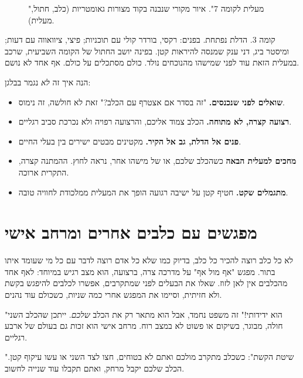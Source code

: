 \begin{figure}[h]
  \centering
  \elevatorScene
  \caption{"מעלית לקומה 7". איור מקורי שנבנה בקוד  מצורות גאומטריות (כלב, חתול, מעלית).}
  \label{fig:elevator}
\end{figure}

קומה 3. הדלת נפתחת. בפנים: רקסי, בורדר קולי עם תוכניות; פיצי, צ\gr יוואווה עם דעות; ומיסטר ביג,
דני ענק שמנסה להיראות קטן. בפינה יושב החתול של הקומה השביעית, שרכב במעלית הזאת עוד לפני
שמישהו מהנוכחים נולד. כולם מסתכלים על כולם. אף אחד לא נושם.

הנה איך זה \emph{לא} נגמר בבלגן:

\begin{tipbox}
\begin{itemize}
  \item \textbf{שואלים לפני שנכנסים.} "זה בסדר אם אצטרף עם הכלב?" זאת לא חולשה, זה נימוס.
  \item \textbf{רצועה קצרה, לא מתוחה.} הכלב צמוד אליכם, והרצועה רפויה ולא נכרכת סביב רגליים.
  \item \textbf{פנים אל הדלת, גב אל הקיר.} מקטינים מבטים ישירים בין בעלי החיים.
  \item \textbf{מחכים למעלית הבאה} כשהכלב שלכם, או של מישהו אחר, נראה לחוץ. ההמתנה קצרה, התקרית
        ארוכה.
  \item \textbf{מתגמלים שקט.} חטיף קטן על ישיבה רגועה הופך את המעלית ממלכודת לחוויה טובה.
\end{itemize}
\end{tipbox}

\section{מפגשים עם כלבים אחרים ומרחב אישי}
לא כל כלב רוצה להכיר כל כלב, בדיוק כמו שלא כל אדם רוצה לדבר עם כל מי שעומד איתו בתור. מפגש
"אף מול אף" על מדרכה צרה, ברצועה, הוא מצב רגיש במיוחד: לאף אחד מהכלבים אין לאן לזוז.
שאלו את הבעלים לפני שמתקרבים, אפשרו לכלבים להיפגש בקשת ולא חזיתית, וסיימו את המפגש אחרי כמה
שניות, כשכולם עוד נהנים.

\begin{mistakebox}
"הוא ידידותי!" זה משפט נחמד, אבל הוא מתאר רק את הכלב \emph{שלכם}. ייתכן שהכלב השני חולה, מבוגר,
בשיקום או פשוט לא במצב רוח. מרחב אישי הוא זכות גם בעולם של ארבע רגליים.
\end{mistakebox}

\begin{fieldbox}
"שיטת הקשת": כשכלב מתקרב מולכם ואתם לא בטוחים, חצו לצד השני או עשו עיקוף קטן. הכלב שלכם
יקבל מרחק, ואתם תקבלו עוד שנייה לחשוב.
\end{fieldbox}

